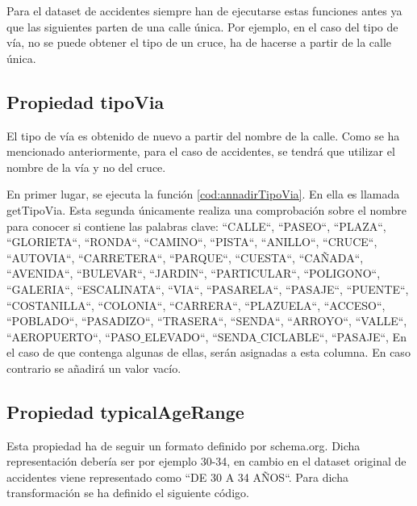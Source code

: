 



Para el dataset de accidentes siempre han de ejecutarse estas funciones antes ya que las siguientes parten de una calle única. Por ejemplo, en el caso del tipo de vía, no se puede obtener el tipo de un cruce, ha de hacerse a partir de la calle única.



\clearpage
\subsection{Propiedad tipoVia}

El tipo de vía es obtenido de nuevo a partir del nombre de la calle. Como se ha mencionado anteriormente, para el caso de accidentes, se tendrá que utilizar el nombre de la vía y no del cruce.



En primer lugar, se ejecuta la función \ref{cod:annadirTipoVia}. En ella es llamada getTipoVia. Esta segunda únicamente realiza una comprobación sobre el nombre para conocer si contiene las palabras clave: ``CALLE``, ``PASEO``, ``PLAZA``, ``GLORIETA``, ``RONDA``, ``CAMINO``, ``PISTA``, ``ANILLO``, ``CRUCE``, ``AUTOVIA``, ``CARRETERA``, ``PARQUE``, ``CUESTA``, ``CAÑADA``, ``AVENIDA``, ``BULEVAR``, ``JARDIN``, ``PARTICULAR``, ``POLIGONO``, ``GALERIA``, ``ESCALINATA``, ``VIA``, ``PASARELA``, ``PASAJE``, ``PUENTE``, ``COSTANILLA``, ``COLONIA``, ``CARRERA``, ``PLAZUELA``, ``ACCESO``, ``POBLADO``, ``PASADIZO``, ``TRASERA``, ``SENDA``, ``ARROYO``, ``VALLE``, ``AEROPUERTO``, ``PASO$\_$ELEVADO``, ``SENDA$\_$CICLABLE``, ``PASAJE``,  En el caso de que contenga algunas de ellas, serán asignadas a esta columna. En caso contrario se añadirá un valor vacío.

\clearpage
\subsection{Propiedad typicalAgeRange}

Esta propiedad ha de seguir un formato definido por schema.org. Dicha representación debería ser por ejemplo 30-34, en cambio en el dataset original de accidentes viene representado como ``DE 30 A 34 AÑOS``. Para dicha transformación se ha definido el siguiente código.

